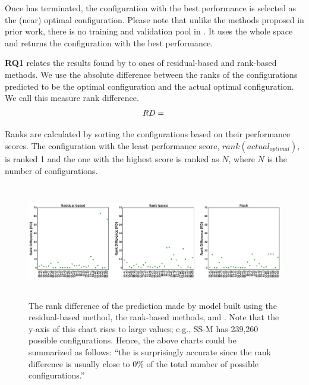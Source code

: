 Once \flash has terminated, the configuration with the best performance is selected as the (near) optimal configuration. Please note that unlike the methods proposed in prior work, there is no training and validation pool in \flash. It uses the whole space and returns the configuration with the best performance. 



\textbf{RQ1} relates the results found by \flash to ones of residual-based and rank-based methods. We use the absolute difference between the ranks of the configurations predicted to be the optimal configuration and the actual optimal configuration. We call this measure rank difference.
\begin{equation}\label{eq:rankdiff}
    \begin{split}
        RD &= \abs[Big]{\mathit{rank(actual_{optimal})} - \mathit{rank(predicted_{optimal})}}\\
    \end{split}
\end{equation}



\noindent Ranks are calculated by sorting the configurations based on their performance scores. The configuration with the least performance score, $\mathit{rank(actual_{optimal})}$, is ranked 1 and the one with the highest score is ranked as $N$, where $N$ is the number of configurations.



\begin{figure}[t]
\centering
\includegraphics[width=0.85\paperwidth, height=5cm]{Figures/one_obj_rd.eps}
\caption{
    \small{The rank difference of the prediction made by model built using the residual-based method, the rank-based methods, and \flash. Note that the y-axis of this chart rises to large values; e.g., SS-M has 239,260 possible configurations. Hence, the above charts could be summarized as follows: ``the \flash is surprisingly accurate since the rank difference is usually close to 0\% of the total number of possible configurations.'' 
    }
}\label{fig:one_obj_rd}
\end{figure}


